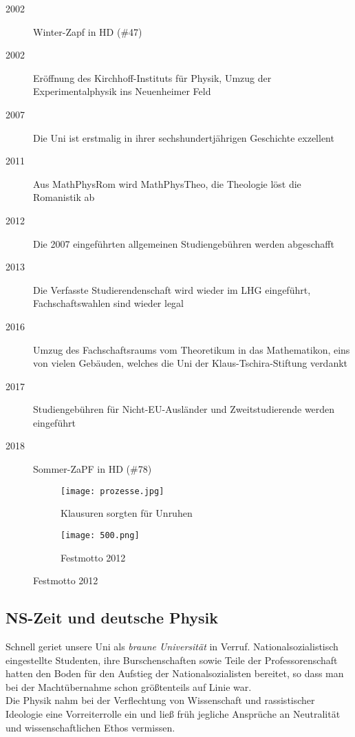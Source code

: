 \begin{description}
\item[2002] Winter-Zapf in HD (\#47)
\item[2002] Eröffnung des Kirchhoff-Instituts für Physik, Umzug der Experimentalphysik ins Neuenheimer Feld
\item[2007] Die Uni ist erstmalig in ihrer sechshundertjährigen Geschichte exzellent
\item[2011] Aus MathPhysRom wird MathPhysTheo, die Theologie löst die Romanistik ab
\item[2012] Die 2007 eingeführten allgemeinen Studiengebühren werden abgeschafft
\item[2013] Die Verfasste Studierendenschaft wird wieder im LHG eingeführt, Fachschaftswahlen sind wieder legal
\item[2016] Umzug des Fachschaftsraums vom Theoretikum in das Mathematikon, eins von vielen Gebäuden, welches die Uni der Klaus-Tschira-Stiftung verdankt
\item[2017] Studiengebühren für Nicht-EU-Ausländer und Zweitstudierende werden eingeführt
\item[2018] Sommer-ZaPF in HD (\#78)
\end{description}

\begin{figure}[t]
\captionsetup[subfigure]{labelformat=empty} 
\begin{subfigure}{0.5\textwidth}
\centering
\texttt{[image: prozesse.jpg]} 
\caption{Klausuren sorgten für Unruhen}
\end{subfigure}
\begin{subfigure}{0.5\textwidth}
\centering
\texttt{[image: 500.png]}
\caption{Festmotto 2012}
\end{subfigure}
\end{figure}


\subsection*{NS-Zeit und deutsche Physik}


Schnell geriet unsere Uni als \textit{braune Universität} in Verruf. Nationalsozialistisch eingestellte Studenten, ihre Burschenschaften sowie Teile der Professorenschaft hatten den Boden für den Aufstieg der Nationalsozialisten bereitet, so dass man bei der Machtübernahme schon größtenteils auf Linie war.\\
Die Physik nahm bei der Verflechtung von Wissenschaft und rassistischer Ideologie eine Vorreiterrolle ein und ließ früh jegliche Ansprüche an Neutralität und wissenschaftlichen Ethos vermissen.

